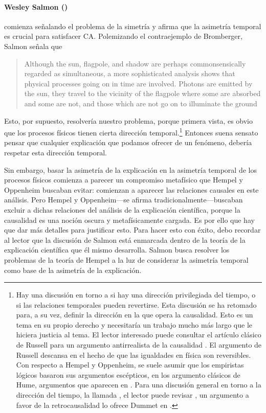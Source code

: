 \paragraph{Wesley Salmon (\citeyear{Salmon1970})} comienza
señalando el problema de la simetría y afirma que la
asimetría temporal es crucial para satisfacer CA. Polemizando el contraejemplo de
Bromberger, Salmon señala que

 \begin{quote} 
    Although the sun, flagpole, and shadow are perhaps
    commonsensically regarded as simultaneous, a more
    sophisticated analysis shows that physical processes
    going on in time are involved.	Photons are emitted by
    the sun, they travel to the	vicinity of the flagpole
    where some are absorbed and some are not, and those
    which are not go on to illuminate the ground
    \parencite[p.~72]{Salmon1970}
 \end{quote}

Esto, por supuesto, resolvería nuestro problema, porque
primera vista, es obvio que los procesos físicos tienen
cierta dirección temporal.\footnote{ 
  Hay una discusión en torno a si hay una dirección
  privilegiada del tiempo, o si las relaciones temporales
  pueden revertirse. Esta discusión se ha retomado para, a
  su vez, definir la dirección en la que opera la
  causalidad. Esto es un tema en su propio derecho y
  necesitaría un trabajo mucho más largo que le hiciera
  justicia al tema. El lector interesado puede consultar el
  artículo clásico de Russell para un argumento
  antirrealista de la causalidad
  \parencite{onthecauserussell}. El argumento de Russell
  descansa en el hecho de que las igualdades en física son
  reversibles. Con respecto a Hempel y Oppenheim, se suele
  asumir que los empiristas lógicos basaron sus argumentos
  escépticos, en los argumento clásicos de Hume, argumentos
  que aparecen en \parencite{hume1784}. Para una discusión
  general en torno a la dirección del tiempo, la llamada
  , el lector puede revisar
  \parencite{utmArrowTime}, un argumento a favor de la
  retrocausalidad lo ofrece Dummet en
  \parencite{dummetcause}.
}
Entonces suena sensato pensar que cualquier explicación que podamos
ofrecer de un fenómeno, debería respetar esta dirección
temporal.

Sin embargo, basar la asimetría de la explicación en la
asimetría temporal de los procesos físicos comienza a
parecer un compromiso metafísico que Hempel y Oppenheim
buscaban evitar: comienzan a aparecer las relaciones
causales en este análisis. Pero
Hempel y Oppenheim---se afirma tradicionalmente---buscaban  
excluir a dichas relaciones del análisis de la explicación científica, porque la
causalidad es una noción oscura y metafísicamente cargada.
Es por ello que hay que dar más detalles para justificar
esto. Para hacer
esto con éxito, debo recordar al lector que la discusión de
Salmon está enmarcada dentro de la teoría de la explicación
científica que él mismo desarrolla. Salmon busca resolver
los problemas de la teoría de Hempel a la luz de considerar
la asimetría temporal como base de la asimetría de la explicación. 

